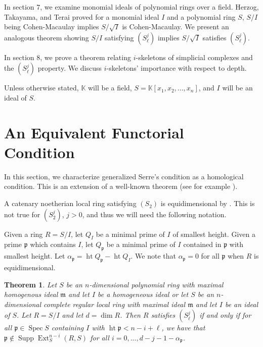 \documentclass[11pt]{amsart}
\numberwithin{equation}{section}
\newtheorem{theorem}{Theorem}[section]
\theoremstyle{definition}
\theoremstyle{remark}
\newcommand{\Spec}{\operatorname{Spec}}
\newcommand{\height}{\operatorname{ht}}
\newcommand{\Ext}{\operatorname{Ext}}
\newcommand{\Supp}{\operatorname{Supp}}
\begin{document}
In section $7$, we examine monomial ideals of polynomial rings over a field.  Herzog, Takayama, and Terai \cite{HT05} proved for a monomial ideal $I$ and a polynomial ring $S$, $S/I$ being Cohen-Macaulay implies $S/\sqrt{I}$ is Cohen-Macaulay. We present an analogous theorem showing $S/I$ satisfying $(S_\ell ^j)$ implies $S/\sqrt{I}$ satisfies $(S_\ell ^j)$. 


In section $8$, we prove a theorem relating $i$-skeletons of simplicial complexes and the $(S_\ell^j)$ property.  We discuss $i$-skeletons' importance with respect to depth.

Unless otherwise stated, $\mathbb{K}$ will be a field, $S=\mathbb{K}[x_1,x_2,...,x_n]$, and $I$ will be an ideal of $S$.

\section{An Equivalent Functorial Condition}

In this section, we characterize generalized Serre's condition as a homological condition.  This is an extension of a well-known theorem (see for example \cite[Proposition 2.6]{DH16}).

A catenary noetherian local ring satisfying $(S_2)$ is equidimensional by \cite[Remark 2.4.1]{Ha62}.  This is not true for $(S_2^j)$, $j>0$, and thus we will need the following notation. 

Given a ring $R=S/I$, let $Q_I$ be a minimal prime of $I$ of smallest height.  Given a prime $\mathfrak{p}$ which contains $I$, let $Q_{\mathfrak{p}}$ be a minimal prime of $I$ contained in $\mathfrak{p}$ with smallest height.  Let $\alpha_{\mathfrak{p}} = \height Q_{\mathfrak{p}} - \height Q_I$.  We note that $\alpha_{\mathfrak{p}} = 0$ for all $\mathfrak{p}$ when $R$ is equidimensional.

\begin{theorem}
Let $S$ be an $n$-dimensional polynomial ring with maximal homogenous ideal $\mathfrak{m}$ and let $I$ be a homogeneous ideal or let $S$ be an $n$-dimensional complete regular local ring with maximal ideal $\mathfrak{m}$ and let $I$ be an ideal of $S$.  Let  $R=S/I$ and let $d=\dim R$.  Then $R$ satisfies $(S_{\ell}^j)$ if and only if for all $\mathfrak{p} \in \Spec S$ containing $I$ with $\height \mathfrak{p} < n-i+\ell$, we have that $\mathfrak{p} \notin \Supp \Ext _S ^{n-i} (R,S)$ for all $i = 0,...,d-j-1-\alpha_\mathfrak{p}$.
\end{theorem}
\end{document}
